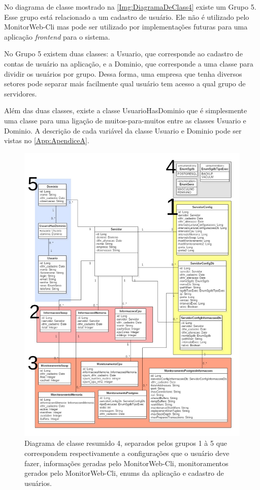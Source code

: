 No diagrama de classe mostrado na \autoref{Img:DiagramaDeClass4} existe um Grupo 5. Esse grupo está relacionado a um cadastro de usuário. Ele não é utilizado pelo MonitorWeb-Cli mas pode ser utilizado por implementações futuras para uma aplicação \textit{frontend} para o sistema. 

No Grupo 5 existem duas classes: a Usuario, que corresponde ao cadastro de contas de usuário na aplicação, e a Dominio, que corresponde a uma classe para dividir os usuários por grupo. Dessa forma, uma empresa que tenha diversos setores pode separar mais facilmente qual usuário tem acesso a qual grupo de servidores.

Além das duas classes, existe a classe UsuarioHasDominio que é simplesmente uma classe para uma ligação de muitos-para-muitos entre as classes Usuario e Dominio. A descrição de cada variável da classe Usuario e Dominio pode ser vistas no \autoref{App:ApendiceA}.
 
\begin{figure}[H]
	\centering
	\includegraphics[width=1.0\textwidth]{figuras/DiagramaDeClass4.jpg}
	\caption[Diagrama de classe resumido 4.]{Diagrama de classe resumido 4, separados pelos grupos 1 à 5 que correspondem respectivamente a configurações que o usuário deve fazer, informações geradas pelo MonitorWeb-Cli, monitoramentos gerados pelo MonitorWeb-Cli, enums da aplicação e cadastro de usuários.}
	\label{Img:DiagramaDeClass4}
\end{figure}


